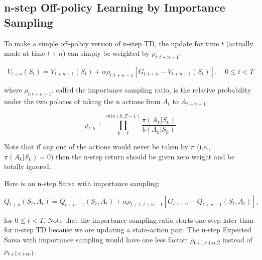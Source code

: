 \documentclass[11pt]{article}
\begin{document}
\subsection{n-step Off-policy Learning by Importance Sampling}
\label{sec:orgc4d012e}

To make a simple off-policy version of n-step TD, the update for time \(t\)
(actually made at time \(t + n\)) can simply be weighted by \(\rho_{t:t+n-1}\):

\begin{equation}
V_{t+n}(S_t) \doteq V_{t+n-1}(S_t) + \alpha \rho_{t:t+n-1} [G_{t:t+n} - V_{t+n-1}(S_t)], \quad 0 \leq t < T
\end{equation}

where \(\rho_{t:t+n-1}\), called the importance sampling ratio, is the relative
probability under the two policies of taking the n actions from \(A_t\) to
\(A_{t+n-1}\):

\begin{equation}
\rho_{t:h} \doteq \prod\limits_{k=t}^{min(h, T-1)} \frac{\pi(A_k|S_k)}{b(A_k|S_k)}
\end{equation}

Note that if any one of the actions would never be taken by \(\pi\) (i.e.,
\(\pi(A_k|S_k) = 0)\) then the n-step return should be given zero weight and be totally
ignored.

Here is an n-step Sarsa with importance sampling:

\begin{equation}
Q_{t+n}(S_t, A_t) \doteq Q_{t+n-1}(S_t, A_t) + \alpha \rho_{t+1:t+n-1} [G_{t:t+n} - Q_{t+n-1}(S_t, A_t)],
\end{equation}

for \(0 \leq t < T\). Note that the importance sampling ratio starts one step
later than for n-step TD because we are updating a state-action pair. The n-step
Expected Sarsa with importance sampling would have one less factor:
\(\rho\)\textsubscript{t+1:t+n-2} instead of \(\rho\)\textsubscript{t+1:t+n-1}.
\end{document}
